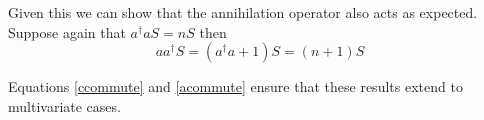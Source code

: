 \documentclass[letterpaper,twocolumn,10pt]{article}
\begin{document}
Given this we can show that the annihilation operator also acts as expected. Suppose again that $a^\dag a S = nS$ then
\[
a a^\dag S = (a^\dag a+1)S = (n+1)S
\]

Equations \ref{ccommute} and \ref{acommute} ensure that these results extend to multivariate cases.



\begin{comment}

\subsection{State approximation: Projecting to lower dimensional spaces}

We can also often approximate a high-dimensional probabilistic state in a lower dimensional space that is more practical to work with.

\subsection{State abstraction: Projection to lower dimensional spaces without approximation}


\section{Integrating over propensities: The path integral}

\section{Data assimilation}
\section{ABM as a computational paradigm}

We define an ABM as a set of (Turing complete) computational processes, which we call \textit{agents}. Without loss of generality, we assume that each agent is executing the same program, although their internal states may differ. In addition, there is an \textit{environment} which has a finite state and a \textit{public API} through which any agent may perform actions or query for information. Similarly, the each agent has a public API through which the environment may act on the agent or gain information about the state of the agent. The environment can also create or annihilate agents.

Computation proceeds in three modes
\begin{description}


\end{comment}
\end{document}
